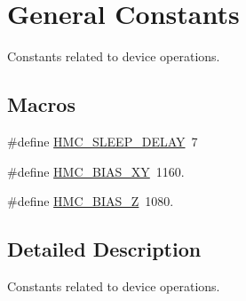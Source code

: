 \hypertarget{group___general_constants}{\section{General Constants}
\label{group___general_constants}
}


Constants related to device operations.  


\subsection*{Macros}
\begin{DoxyCompactItemize}
\item 
\#define \hyperlink{group___general_constants_ga26afbcf737f1add055ea8929c03648a9}{H\+M\+C\+\_\+\+S\+L\+E\+E\+P\+\_\+\+D\+E\+L\+A\+Y}~7
\item 
\#define \hyperlink{group___general_constants_ga1c6efa9689c426e25ae1f2467430b876}{H\+M\+C\+\_\+\+B\+I\+A\+S\+\_\+\+X\+Y}~1160.
\item 
\#define \hyperlink{group___general_constants_gacea61ca68e8efbad8a0f398051b84e29}{H\+M\+C\+\_\+\+B\+I\+A\+S\+\_\+\+Z}~1080.
\end{DoxyCompactItemize}


\subsection{Detailed Description}
Constants related to device operations. 



